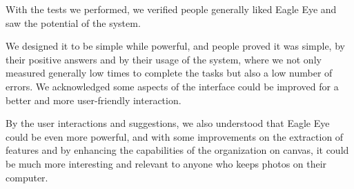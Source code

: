 With the tests we performed, we verified people generally liked Eagle Eye and saw the potential of the system.

We designed it to be simple while powerful, and people proved it was simple, by their positive answers and by their usage of the system, where we not only measured generally low times to complete the tasks but also a low number of errors. We acknowledged some aspects of the interface could be improved for a better and more user-friendly interaction.

By the user interactions and suggestions, we also understood that Eagle Eye could be even more powerful, and with some improvements on the extraction of features and by enhancing the capabilities of the organization on canvas, it could be much more interesting and relevant to anyone who keeps photos on their computer.

